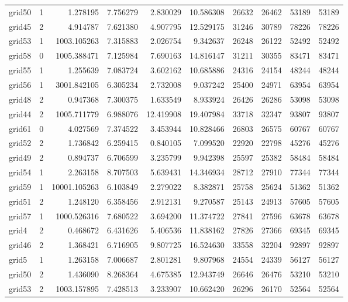\begin{longtable}{|l|r|r|r|r|r|r|r|r|r|}
grid50 & 1 & 1.278195 & 7.756279 & 2.830029 & 10.586308 & 26632 & 26462 & 53189 & 53189 \\
grid45 & 2 & 4.914787 & 7.621380 & 4.907795 & 12.529175 & 31246 & 30789 & 78226 & 78226 \\
grid53 & 1 & 1003.105263 & 7.315883 & 2.026754 & 9.342637 & 26248 & 26122 & 52492 & 52492 \\
grid58 & 0 & 1005.388471 & 7.125984 & 7.690163 & 14.816147 & 31211 & 30355 & 83471 & 83471 \\
grid55 & 1 & 1.255639 & 7.083724 & 3.602162 & 10.685886 & 24316 & 24154 & 48244 & 48244 \\
grid56 & 1 & 3001.842105 & 6.305234 & 2.732008 & 9.037242 & 25400 & 24971 & 63954 & 63954 \\
grid48 & 2 & 0.947368 & 7.300375 & 1.633549 & 8.933924 & 26426 & 26286 & 53098 & 53098 \\
grid44 & 2 & 1005.711779 & 6.988076 & 12.419908 & 19.407984 & 33718 & 32347 & 93807 & 93807 \\
grid61 & 0 & 4.027569 & 7.374522 & 3.453944 & 10.828466 & 26803 & 26575 & 60767 & 60767 \\
grid52 & 2 & 1.736842 & 6.259415 & 0.840105 & 7.099520 & 22920 & 22798 & 45276 & 45276 \\
grid49 & 2 & 0.894737 & 6.706599 & 3.235799 & 9.942398 & 25597 & 25382 & 58484 & 58484 \\
grid54 & 1 & 2.263158 & 8.707503 & 5.639431 & 14.346934 & 28712 & 27910 & 77344 & 77344 \\
grid59 & 1 & 10001.105263 & 6.103849 & 2.279022 & 8.382871 & 25758 & 25624 & 51362 & 51362 \\
grid51 & 2 & 1.248120 & 6.358456 & 2.912131 & 9.270587 & 25143 & 24913 & 57605 & 57605 \\
grid57 & 1 & 1000.526316 & 7.680522 & 3.694200 & 11.374722 & 27841 & 27596 & 63678 & 63678 \\
grid4 & 2 & 0.468672 & 6.431626 & 5.406536 & 11.838162 & 27826 & 27366 & 69345 & 69345 \\
grid46 & 2 & 1.368421 & 6.716905 & 9.807725 & 16.524630 & 33558 & 32204 & 92897 & 92897 \\
grid5 & 1 & 1.263158 & 7.006687 & 2.801281 & 9.807968 & 24554 & 24339 & 56127 & 56127 \\
grid50 & 2 & 1.436090 & 8.268364 & 4.675385 & 12.943749 & 26646 & 26476 & 53210 & 53210 \\
grid53 & 2 & 1003.157895 & 7.428513 & 3.233907 & 10.662420 & 26296 & 26170 & 52564 & 52564 \\

\end{longtable}
